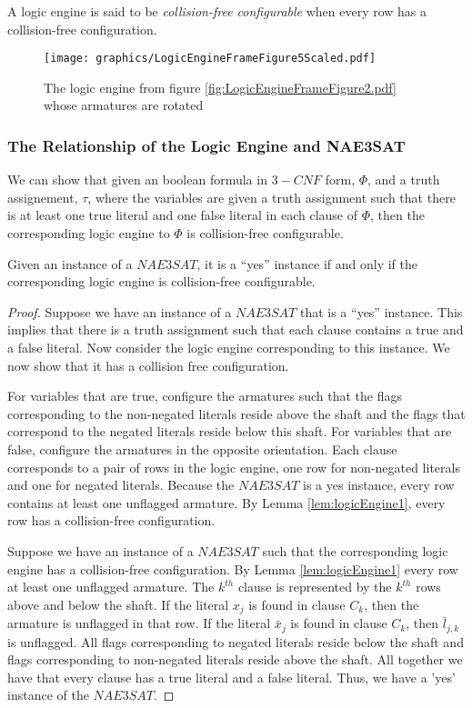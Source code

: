 A logic engine is said to be \textit{collision-free configurable} when every row has a collision-free configuration.
\begin{figure}[!h]
\begin{center}
\texttt{[image: graphics/LogicEngineFrameFigure5Scaled.pdf]}
\caption{The logic engine from figure \ref{fig:LogicEngineFrameFigure2.pdf} whose armatures are rotated}\label{fig:LogicEngineFrameFigure5.pdf}
\end{center}
\end{figure}

\subsubsection{The Relationship of the Logic Engine and NAE3SAT}

We can show that given an boolean formula in $3-CNF$ form, $\Phi$, and a truth assignement, $\tau$, where the variables are given a truth assignment such that there is at least one true literal and one false literal in each clause of $\Phi$, then the corresponding logic engine to $\Phi$ is collision-free configurable.
\begin{thm}\label{thm:Satisfiability-1}
 Given an instance of a $NAE3SAT$,  it is a ``yes'' instance if and only if the corresponding logic 
engine is collision-free configurable.
\end{thm}
\begin{proof}
Suppose we have an instance of a $NAE3SAT$ that is a ``yes'' instance. This implies that there is a 
truth assignment such that each clause contains a true and a false literal. Now consider the logic 
engine corresponding to this instance. We now 
show that it has a collision free configuration.

For variables that are true, configure the armatures such that the flags corresponding to the 
non-negated literals reside above the 
shaft and the flags that correspond to the negated literals reside below this shaft.  For variables 
that are false, configure the 
armatures in the opposite orientation.  Each clause corresponds to a pair of rows in 
the logic engine, one row for non-negated literals and one for negated literals.  Because the 
$NAE3SAT$ is a yes instance, every row contains at least one unflagged armature.  
By Lemma \ref{lem:logicEngine1}, every row  has a collision-free configuration.

Suppose we have an instance of a $NAE3SAT$ such that the corresponding logic engine has a 
collision-free configuration. By Lemma \ref{lem:logicEngine1} every row at least one unflagged 
armature.  The $k^{th}$ clause is represented by the $k^{th}$ rows above and below the shaft. If the 
literal $x_j$ is found in clause $C_k$, then the armature is unflagged in that row. If the literal 
$\bar{x}_j$ is found in clause $C_k$, then $\bar{l}_{j,k}$ is unflagged.  All flags 
corresponding to negated literals reside below the shaft and flags corresponding to non-negated 
literals reside above the shaft.  All together we have that every clause has a true literal and a 
false literal.  Thus, we have a 'yes' instance of the $NAE3SAT$.
\end{proof}

